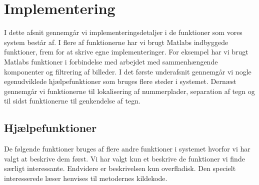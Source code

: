 \section{Implementering}
\label{sec:implementation}

I dette afsnit gennemgår vi implementeringsdetaljer i de funktioner som vores system består af. I flere af funktionerne har vi brugt Matlabs indbyggede funktioner, frem for at skrive egne implementeringer. For eksempel har vi brugt Matlabs funktioner i forbindelse med arbejdet med sammenhængende komponenter og filtrering af billeder. I det første underafsnit gennemgår vi nogle egenudviklede hjælpefunktioner som bruges flere steder i systemet. Dernæst gennemgår vi funktionerne til lokalisering af nummerplader, separation af tegn og til sidst funktionerne til genkendelse af tegn.





\subsection{Hjælpefunktioner}
\label{sec:imp:hjaelpefunktioner}
De følgende funktioner bruges af flere andre funktioner i systemet hvorfor vi har valgt at beskrive dem først. Vi har valgt kun et beskrive de funktioner vi finde særligt interessante. Endvidere er beskrivelsen kun overfladisk. Den specielt interesserede læser henvises til metodernes kildekode.

